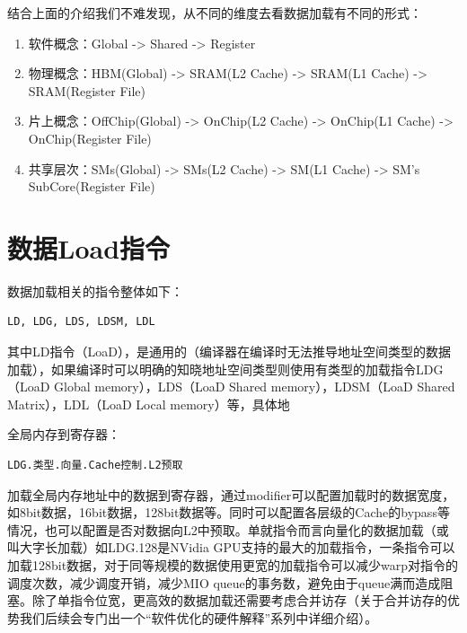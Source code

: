 结合上面的介绍我们不难发现，从不同的维度去看数据加载有不同的形式：

\begin{enumerate}
\item 软件概念：Global -\textgreater{} Shared -\textgreater{} Register

\item 物理概念：HBM(Global) -\textgreater{} SRAM(L2 Cache) -\textgreater{} SRAM(L1 Cache) -\textgreater{} SRAM(Register File)

\item 片上概念：OffChip(Global) -\textgreater{} OnChip(L2 Cache) -\textgreater{} OnChip(L1 Cache) -\textgreater{} OnChip(Register File)

\item 共享层次：SMs(Global) -\textgreater{} SMs(L2 Cache) -\textgreater{} SM(L1 Cache) -\textgreater{} SM's SubCore(Register File)
\end{enumerate}

\section{数据Load指令}

数据加载相关的指令整体如下：

\begin{lstlisting}
LD, LDG, LDS, LDSM, LDL
\end{lstlisting}

其中LD指令（LoaD），是通用的（编译器在编译时无法推导地址空间类型的数据加载），如果编译时可以明确的知晓地址空间类型则使用有类型的加载指令LDG（LoaD Global memory），LDS（LoaD Shared memory），LDSM（LoaD Shared Matrix），LDL（LoaD Local memory）等，具体地

全局内存到寄存器：

\begin{lstlisting}
LDG.类型.向量.Cache控制.L2预取
\end{lstlisting}

加载全局内存地址中的数据到寄存器，通过modifier可以配置加载时的数据宽度，如8bit数据，16bit数据，128bit数据等。同时可以配置各层级的Cache的bypass等情况，也可以配置是否对数据向L2中预取。单就指令而言向量化的数据加载（或叫大字长加载）如LDG.128是NVidia GPU支持的最大的加载指令，一条指令可以加载128bit数据，对于同等规模的数据使用更宽的加载指令可以减少warp对指令的调度次数，减少调度开销，减少MIO queue的事务数，避免由于queue满而造成阻塞。除了单指令位宽，更高效的数据加载还需要考虑合并访存（关于合并访存的优势我们后续会专门出一个“软件优化的硬件解释”系列中详细介绍）。

